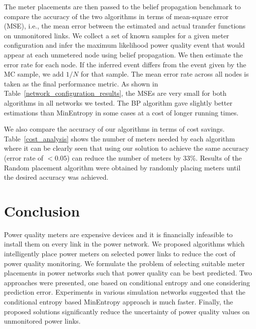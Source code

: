 The meter placements are then passed to the belief propagation benchmark to compare the accuracy of the two algorithms in terms of mean-square error (MSE), i.e., the mean error between the estimated and actual transfer functions on unmonitored links. We collect a set of known samples for a given meter configuration and infer the maximum likelihood power quality event that would appear at each unmetered node using belief propagation. We then estimate the error rate for each node. If the inferred event differs from the event given by the MC sample, we add $1/N$ for that sample. The mean error rate across all nodes is taken as the final performance metric. As shown in Table~\ref{network_configuration_results}, the MSEs are very small for both algorithms in all networks we tested. The BP algorithm gave slightly better estimations than MinEntropy in some cases at a cost of longer running times.

We also compare the accuracy of our algorithms in terms of cost savings. Table~\ref{cost_analysis} shows the number of meters needed by each algorithm where it can be clearly seen that using our solution to achieve the same accuracy (error rate of $< 0.05$) can reduce the number of meters by 33\%. Results of the Random placement algorithm were obtained by randomly placing meters until the desired accuracy was achieved.


\section{Conclusion}
\label{sec:conclusion}
Power quality meters are expensive devices and it is financially infeasible to install them on every link in the power network. We proposed algorithms which intelligently place power meters on selected power links to reduce the cost of power quality monitoring. We formulate the problem of selecting suitable meter placements in power networks such that power quality can be best predicted. Two approaches were presented, one based on conditional entropy and one considering prediction error.  Experiments in various simulation networks suggested that the conditional entropy based MinEntropy approach is much faster. Finally, the proposed solutions significantly reduce the uncertainty of power quality values on unmonitored power links.